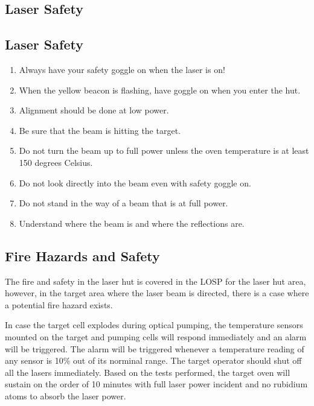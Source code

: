 \begin{safetyen}{10}{5}
\section{Laser Safety}
\label{sec:lsafe}

\subsection{Laser Safety}
\label{sec:lassaf}

\begin{enumerate}
\item Always have your safety goggle on when the laser is on!
\item When the yellow beacon is flashing, have goggle on when you enter
the hut.
\item Alignment should be done at low power.
\item Be sure that the beam is hitting the target.
\item Do not turn the beam up to full power unless the oven temperature
is at least 150 degrees Celsius.
\item Do not look directly into the beam even with safety goggle on.
\item Do not stand in the way of a beam that is at full power.
\item Understand where the beam is and where the reflections are.
\end{enumerate}

\subsection{Fire Hazards and Safety}
\label{sec:targ-polhelfire}

The fire and safety in the laser hut is covered in the LOSP
for the laser hut area,
however, in the target area where the laser beam is directed, there is a
case where a potential 
fire hazard exists. 

In case the target cell explodes during optical pumping, the temperature 
sensors mounted on the target and pumping cells will respond immediately and 
an alarm will be triggered. The alarm will be triggered whenever 
a temperature reading of any sensor is 10$\%$ out of its norminal range.
The target operator should shut off all the lasers immediately.
Based on the tests performed, the target oven will sustain on the order of 10 
minutes with full laser power incident and no rubidium atoms 
to absorb the laser power.



\end{safetyen}

